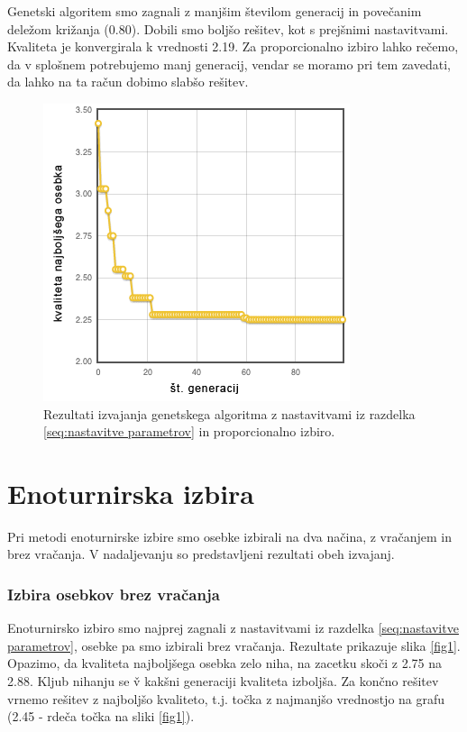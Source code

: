 \documentclass[a4paper, 12pt]{book}
\begin{document}
Genetski algoritem smo zagnali z manj\v sim \v stevilom generacij in pove\v canim dele\v zom kri\v zanja (0.80). Dobili smo bolj\v so re\v sitev, kot s prej\v snimi nastavitvami. Kvaliteta je konvergirala k vrednosti 2.19. Za proporcionalno izbiro lahko re\v cemo, da v splo\v snem potrebujemo manj generacij, vendar se moramo pri tem zavedati, da lahko na ta ra\v cun dobimo slab\v so re\v sitev.

\begin{figure}
\centering
\includegraphics[scale=0.70]{prop_izbira.png}
\caption{Rezultati izvajanja genetskega algoritma z nastavitvami iz razdelka \ref{seq:nastavitve parametrov} in proporcionalno izbiro.}
\label{res:proporcionalna izbira}
\end{figure}

\section{Enoturnirska izbira}
Pri metodi enoturnirske izbire smo osebke izbirali na dva na\v cina, z vra\v canjem in brez vra\v canja. V nadaljevanju so predstavljeni rezultati obeh izvajanj.

\subsubsection{Izbira osebkov brez vra\v canja}
Enoturnirsko izbiro smo najprej zagnali z nastavitvami iz razdelka \ref{seq:nastavitve parametrov}, osebke pa smo izbirali brez vra\v canja. Rezultate prikazuje slika \ref{fig1}. Opazimo, da kvaliteta najbolj\v sega osebka zelo niha, na zacetku sko\v ci z 2.75 na 2.88. Kljub nihanju se \v v kak\v sni generaciji kvaliteta izbolj\v sa. Za kon\v cno re\v sitev vrnemo re\v sitev z najbolj\v so kvaliteto, t.j. to\v cka z najmanj\v so vrednostjo na grafu (2.45 - rde\v ca to\v cka na sliki \ref{fig1}).
\end{document}
